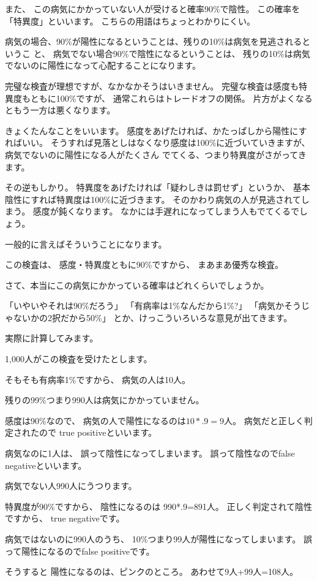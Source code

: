 \documentclass[uplatex,jis2004,dvipdfmx,12pt]{jsarticle}
\begin{document}
また、
この病気にかかっていない人が受けると確率90\%で陰性。
この確率を「特異度」といいます。
こちらの用語はちょっとわかりにくい。

病気の場合、90\%が陽性になるということは、残りの10\%は病気を見逃されるというこ
と、
病気でない場合90\%で陰性になるということは、
残りの10\%は病気でないのに陽性になって心配することになります。

完璧な検査が理想ですが、なかなかそうはいきません。
完璧な検査は感度も特異度もともに100\%ですが、
通常これらはトレードオフの関係。
片方がよくなるともう一方は悪くなります。

きょくたんなことをいいます。
感度をあげたければ、かたっぱしから陽性にすればいい。
そうすれば見落としはなくなり感度は100\%に近づいていきますが、
病気でないのに陽性になる人がたくさん
でてくる、つまり特異度がさがってきます。

その逆もしかり。
特異度をあげたければ「疑わしきは罰せず」というか、
基本陰性にすれば特異度は100\%に近づきます。
そのかわり病気の人が見逃されてしまう。
感度が鈍くなります。
なかには手遅れになってしまう人もでてくるでしょう。

一般的に言えばそういうことになります。

この検査は、
感度・特異度ともに90\%ですから、
まあまあ優秀な検査。


さて、本当にこの病気にかかっている確率はどれくらいでしょうか。

「いやいやそれは90\%だろう」
「有病率は1\%なんだから1\%?」
「病気かそうじゃないかの2択だから50\%」
とか、けっこういろいろな意見が出てきます。

実際に計算してみます。

1,000人がこの検査を受けたとします。

そもそも有病率1\%ですから、
病気の人は10人。

残りの99\%つまり990人は病気にかかっていません。

感度は90\%なので、
病気の人で陽性になるのは$10*.9=9$人。
病気だと正しく判定されたので
true positiveといいます。

病気なのに1人は、
誤って陰性になってしまいます。
誤って陰性なのでfalse negativeといいます。

病気でない人990人にうつります。

特異度が90\%ですから、
陰性になるのは
990*.9=891人。
正しく判定されて陰性ですから、
true negativeです。

病気ではないのに990人のうち、
10\%つまり99人が陽性になってしまいます。
誤って陽性になるのでfalse positiveです。

そうすると
陽性になるのは、ピンクのところ。
あわせて9人+99人=108人。
\end{document}

